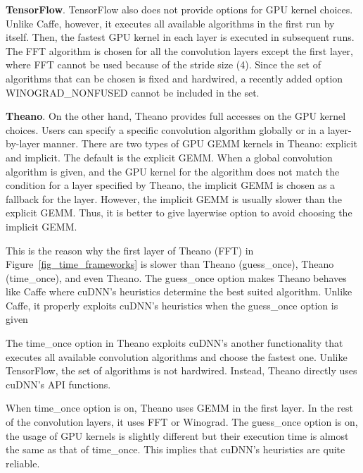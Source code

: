 {\bf TensorFlow}. TensorFlow also does not provide options for GPU kernel choices. Unlike Caffe, however, it executes all available algorithms in the first run by itself. Then, the fastest GPU kernel in each layer is executed in subsequent runs. The FFT algorithm is chosen for all the convolution layers except the first layer, where FFT cannot be used because of the stride size (4). Since the set of algorithms that can be chosen is fixed and hardwired, a recently added option WINOGRAD\_NONFUSED cannot be included in the set.

{\bf Theano}. On the other hand, Theano provides full accesses on the GPU kernel choices. Users can specify a specific convolution algorithm globally or in a layer-by-layer manner. There are two types of GPU GEMM kernels in Theano: explicit and implicit. The default is the explicit GEMM. When a global convolution algorithm is given, and the GPU kernel for the algorithm does not match the condition for a layer specified by Theano, the implicit GEMM is chosen as a fallback for the layer. However, the implicit GEMM is usually slower than the explicit GEMM. Thus, it is better to give layerwise option to avoid choosing the implicit GEMM.  

This is the reason why the first layer of \textsf{Theano (FFT)} in Figure~\ref{fig_time_frameworks} is slower than \textsf{Theano (guess\_once)}, \textsf{Theano (time\_once)}, and even \textsf{Theano}. The \textsf{guess\_once} option makes Theano behaves like Caffe where cuDNN's heuristics determine the best suited algorithm. Unlike Caffe, it properly exploits cuDNN's heuristics when the \textsf{guess\_once} option is given 

The \textsf{time\_once} option in Theano exploits cuDNN's another functionality that executes all available convolution algorithms and choose the fastest one. Unlike TensorFlow, the set of algorithms is not hardwired. Instead, Theano directly uses cuDNN's API functions.

When \textsf{time\_once} option is on, Theano uses GEMM in the first layer. In the rest of the convolution layers, it uses FFT or Winograd. The \textsf{guess\_once} option is on, the usage of GPU kernels is slightly different but their execution time is almost the same as that of \textsf{time\_once}.
This implies that cuDNN's heuristics are quite reliable.

